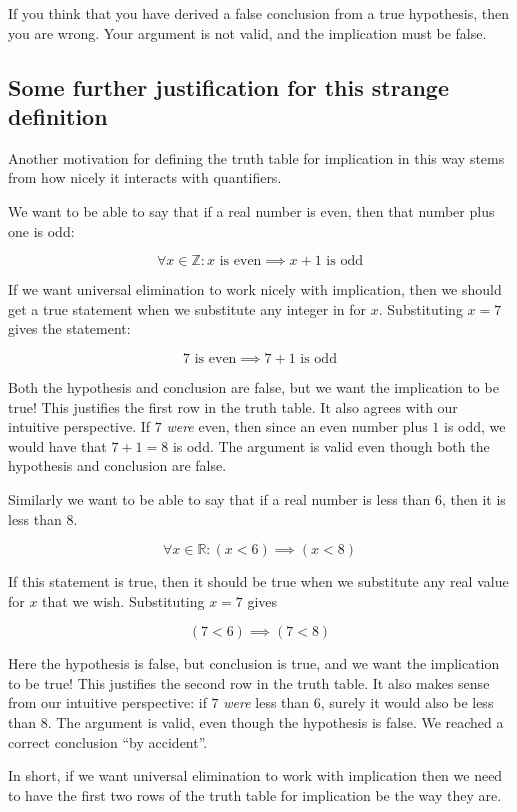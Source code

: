 If you think that you have derived a false conclusion from a true hypothesis, then you are wrong.  Your argument is not valid, and the implication must be false.

\subsection{Some further justification for this strange definition}

Another motivation for defining the truth table for implication in this way stems from how nicely it interacts with quantifiers.

We want to be able to say that if a real number is even, then that number plus one is odd:

\[
 \forall x \in \mathbb{Z}: \textrm{$x$ is even} \implies \textrm{$x+1$ is odd}
\]

If we want universal elimination to work nicely with implication, then we should get a true statement when we substitute any integer in for $x$.  Substituting $x = 7$ gives the statement:

\[
\textrm{$7$ is even} \implies \textrm{$7+1$ is odd}
\]

Both the hypothesis and conclusion are false, but we want the implication to be true!  This justifies the first row in the truth table.  It also agrees with our intuitive perspective.  If $7$ \textit{were} even, then since an even number plus $1$ is odd, we would have that $7+1 = 8$ is odd.  The argument is valid even though both the hypothesis and conclusion are false.

Similarly we want to be able to say that if a real number is less than $6$, then it is less than $8$.

\[
\forall x \in \mathbb{R}: (x< 6) \implies (x<8)
\]

If this statement is true, then it should be true when we substitute any real value for $x$ that we wish.  Substituting $x  = 7$ gives

\[
(7< 6) \implies (7 < 8)
\]

Here the hypothesis is false, but conclusion is true, and we want the implication to be true!  This justifies the second row in the truth table.  It also makes sense from our intuitive perspective:  if $7$ \textit{were} less than $6$, surely it would also be less than $8$.  The argument is valid, even though the hypothesis is false.  We reached a correct conclusion ``by accident''.

In short, if we want universal elimination to work with implication then we need to have the first two rows of the truth table for implication be the way they are.


